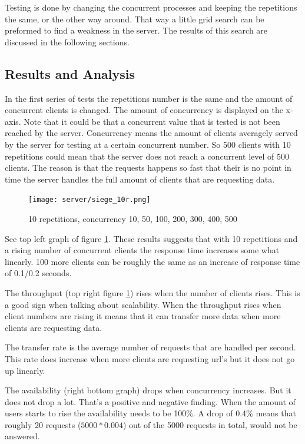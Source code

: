 Testing is done by changing the concurrent processes and keeping the repetitions the same, or the other way around. That way a little grid search can be preformed to find a weakness in the server. The results of this search are discussed in the following sections. 

\subsection{Results and Analysis}
In the first series of tests the repetitions number is the same and the amount of concurrent clients is changed. The amount of concurrency is displayed on the x-axis. Note that it could be that a concurrent value that is tested is not been reached by the server. Concurrency means the amount of clients averagely served by the server for testing at a certain concurrent number. So 500 clients with 10 repetitions could mean that the server does not reach a concurrent level of 500 clients. The reason is that the requests happens so fast that their is no point in time the server handles the full amount of clients that are requesting data.
\begin{figure}[H]
\center
\texttt{[image: server/siege\_10r.png]}
\caption{10 repetitions, concurrency 10, 50, 100, 200, 300, 400, 500}
\label{fig:10r}
\end{figure}
See top left graph of figure \ref{fig:10r}. These results suggests that with 10 repetitions and a rising number of concurrent clients the response time increases some what linearly.  100 more clients can be roughly the same as an increase of response time of 0.1/0.2 seconds. 

The throughput (top right figure \ref{fig:10r}) rises when the number of clients rises. This is a good sign when talking about scalability. When the throughput rises when client numbers are rising it means that it can transfer more data when more clients are requesting data. 

The transfer rate is the average number of requests that are handled per second. This rate does increase when more clients are requesting url's but it does not go up linearly.

The availability (right bottom graph) drops when concurrency increases. But it does not drop a lot. That's a positive and negative finding. When the amount of users starts to rise the availability needs to be 100\%. A drop of 0.4\% means that roughly 20 requests ($5000 * 0.004$) out of the 5000 requests in total, would not be answered. 

